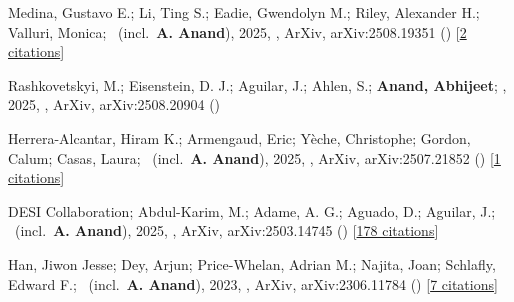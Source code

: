 \item[{\color{numcolor}\scriptsize5}] Medina, Gustavo E.; Li, Ting S.; Eadie, Gwendolyn M.; Riley, Alexander H.; Valluri, Monica; \etal\ (incl.\ \textbf{A. Anand}), 2025, , ArXiv, arXiv:2508.19351 () [\href{https://ui.adsabs.harvard.edu/abs/2025arXiv250819351M}{2 citations}]

\item[{\color{numcolor}\scriptsize4}] Rashkovetskyi, M.; Eisenstein, D. J.; Aguilar, J.; Ahlen, S.; \textbf{Anand, Abhijeet}; \etal, 2025, , ArXiv, arXiv:2508.20904 ()

\item[{\color{numcolor}\scriptsize3}] Herrera-Alcantar, Hiram K.; Armengaud, Eric; Y{\`e}che, Christophe; Gordon, Calum; Casas, Laura; \etal\ (incl.\ \textbf{A. Anand}), 2025, , ArXiv, arXiv:2507.21852 () [\href{https://ui.adsabs.harvard.edu/abs/2025arXiv250721852H}{1 citations}]

\item[{\color{numcolor}\scriptsize2}] DESI Collaboration; Abdul-Karim, M.; Adame, A. G.; Aguado, D.; Aguilar, J.; \etal\ (incl.\ \textbf{A. Anand}), 2025, , ArXiv, arXiv:2503.14745 () [\href{https://ui.adsabs.harvard.edu/abs/2025arXiv250314745D}{178 citations}]

\item[{\color{numcolor}\scriptsize1}] Han, Jiwon Jesse; Dey, Arjun; Price-Whelan, Adrian M.; Najita, Joan; Schlafly, Edward F.; \etal\ (incl.\ \textbf{A. Anand}), 2023, , ArXiv, arXiv:2306.11784 () [\href{https://ui.adsabs.harvard.edu/abs/2023arXiv230611784H}{7 citations}]